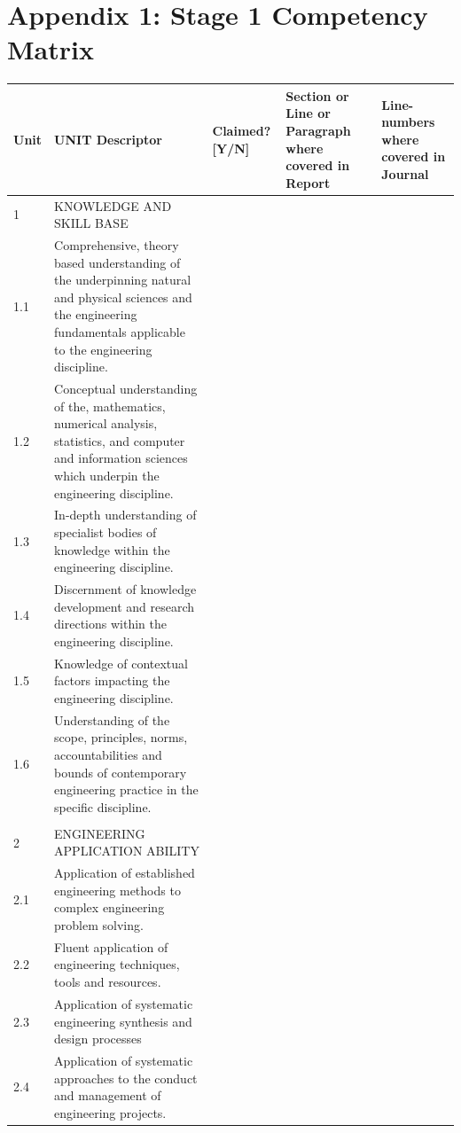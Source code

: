 \documentclass[11pt]{article}
\newenvironment{localsize}[1]
{%
  \clearpage
  \let\orignewcommand\newcommand
  \let\newcommand\renewcommand
  \makeatletter
  \makeatother
  \let\newcommand\orignewcommand
}
{%
  \clearpage
}
\begin{document}
\section{Appendix 1: Stage 1 Competency Matrix}
\begin{localsize}{10}

\begin{table} \centering
 \begin{tabular}{|p{0.75cm} | p{8cm} | p{1.5cm} | p{2.5cm} | p{2.5cm}|} 
 \hline
  Unit & UNIT Descriptor & Claimed? [Y/N] & Section or Line or Paragraph where covered in Report & Line-numbers where covered in Journal\\ [0.5ex] \hline
   1 & KNOWLEDGE AND SKILL BASE & & & \\ \hline
   1.1 & Comprehensive, theory based understanding of the underpinning natural and physical sciences and the engineering fundamentals applicable to the engineering discipline. & & & \\ \hline
   1.2 & Conceptual understanding of the, mathematics, numerical analysis, statistics, and computer and information sciences which underpin the engineering discipline. & & & \\ \hline
   1.3 & In-depth understanding of specialist bodies of knowledge within the engineering discipline. & & & \\ \hline
   1.4 & Discernment of knowledge development and research directions within the
engineering discipline. & & & \\ \hline
   1.5 & Knowledge of contextual factors impacting the
engineering discipline. & & & \\ \hline
   1.6 & Understanding of the scope, principles, norms, accountabilities and bounds of contemporary engineering practice in the specific discipline. & & & \\ \hline
   & & & & \\ \hline
   2 & ENGINEERING APPLICATION ABILITY & & & \\ \hline
   2.1 & Application of established engineering methods to complex engineering problem solving. & & & \\ \hline
   2.2 & Fluent application of engineering techniques, tools and resources. & & & \\ \hline
   2.3 & Application of systematic engineering synthesis and design processes & & & \\ \hline
   2.4 & Application of systematic approaches to the conduct and management of engineering projects. & & & \\ \hline

\end{tabular}
\end{table}
\end{localsize}
\end{document}
